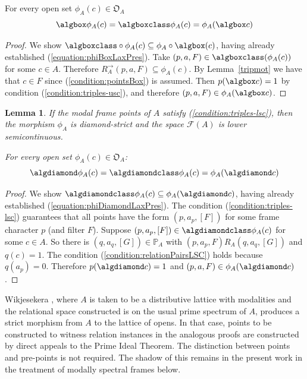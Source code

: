 \documentclass{article}[a4paper]
\newtheorem{lemma}{Lemma}%
\theoremstyle{definition}
\newcommand{\Fcal}{\mathcal{F}} %
\newcommand{\Ofrak}{\mathfrak{O}} %
\newcommand{\Pbb}{\mathbb{P}}
\newcommand{\dirim}{^{\rightarrow\!}}
\begin{document}
For every open set $\phi_A (c) \in \Ofrak_A$
\begin{equation*}
    \algbox \phi_A (c) = \algboxclass \phi_A (c) = \phi_A (\algbox c)
\end{equation*}

\begin{proof} 
We show 
$\algboxclass \circ \phi_A (c) \subseteq \phi_A \circ \algbox (c)$, having already established (\ref{equation:phiBoxLaxPres}).
Take $(p,a,F) \in \algboxclass (\phi_A (c))$ for some $c \in A$. Therefore $R_A \dirim (p,a,F) \subseteq \phi_A(c)$.  By Lemma~\ref{tripmot} we have that $c \in F$ since (\ref{condition:pointsBox}) is assumed. Then $p ( \algbox c) = 1$ by condition (\ref{condition:triples-usc}), and therefore $(p,a,F) \in \phi_A( \algbox c)$. 
\end{proof}

\begin{lemma}
\label{result:lscImpliesDiamoindStrict}
If the modal frame points of $A$ satisfy (\ref{condition:triples-lsc}), then the morphism $\phi_A$ is diamond-strict and the space $\Fcal(A)$ is lower semicontinuous.

For every open set $\phi_A (c) \in \Ofrak_A$:
\begin{equation*}
     \algdiamond \phi_A (c) =
     \algdiamondclass \phi_A (c) = \phi_A (\algdiamond c)
\end{equation*} 
\end{lemma}

\begin{proof}
 We show $\algdiamondclass \phi_A (c) \subseteq \phi _A ( \algdiamond c)$, having already established (\ref{equation:phiDiamondLaxPres}). 
 The condition (\ref{condition:triples-lsc}) guarantees that all points have the form $(p,a_p,[F])$ for some frame character $p$ (and filter $F$). 
    Suppose $(p,a_p,[F]) \in \algdiamondclass \phi _A (c)$ for some $c \in A$. So there is $(q,a_q,[G]) \in \Pbb_A$ with $(p,a_p,F) R_A (q,a_q,[G])$ and $q(c) =1$.  The condition (\ref{condition:relationPairsLSC}) holds because $q(a_p)=0$. Therefore  
    $p(\algdiamond c)=1$ and 
    $(p,a,F) \in \phi _A(\algdiamond c)$.
\end{proof}

Wikjesekera \cite{wijesekera1990constructive}, where $A$ is taken to be a distributive lattice with modalities and the relational space constructed is on the usual prime spectrum of $A$, produces a strict morphism from $A$ to the lattice of opens. In that case, points to be constructed to witness relation instances in the analogous proofs are constructed by direct appeals to the Prime Ideal Theorem. The distinction between points and pre-points is not required. The shadow of this remains in the present work in the treatment of modally spectral frames below.
\end{document}
